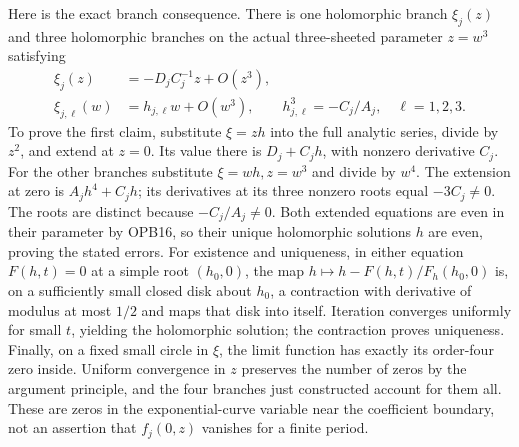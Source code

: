 Here is the exact branch consequence. There is one holomorphic branch
$\xi_j(z)$ and three holomorphic branches on the actual three-sheeted
parameter $z=w^3$ satisfying
\[
 \begin{split}
 \xi_j(z)&=-D_jC_j^{-1}z+O(z^3),\\
 \xi_{j,\ell}(w)&=h_{j,\ell}w+O(w^3),\qquad
 h_{j,\ell}^3=-C_j/A_j,\quad \ell=1,2,3.
 \end{split}\tag{OPB18}
\]
To prove the first claim, substitute $\xi=zh$ into the full analytic
series, divide by $z^2$, and extend at $z=0$. Its value there is
$D_j+C_jh$, with nonzero derivative $C_j$. For the other branches
substitute $\xi=wh,z=w^3$ and divide by $w^4$. The extension at zero
is $A_jh^4+C_jh$; its derivatives at its three nonzero roots equal
$-3C_j\ne0$. The roots are distinct because $-C_j/A_j\ne0$.
Both extended equations are even in their parameter by OPB16, so their
unique holomorphic solutions $h$ are even, proving the stated errors.
For existence and uniqueness, in either equation $F(h,t)=0$ at a simple
root $(h_0,0)$, the map $h\mapsto h-F(h,t)/F_h(h_0,0)$ is, on a
sufficiently small closed disk about $h_0$, a contraction with derivative
of modulus at most $1/2$ and maps that disk into itself. Iteration
converges uniformly for small $t$, yielding the holomorphic solution;
the contraction proves uniqueness. Finally, on a fixed small circle in
$\xi$, the limit function has exactly its order-four zero inside.
Uniform convergence in $z$ preserves the number of zeros by the argument
principle, and the four branches just constructed account for them all.
These are zeros in the exponential-curve variable near the coefficient
boundary, not an assertion that $f_j(0,z)$ vanishes for a finite period.

